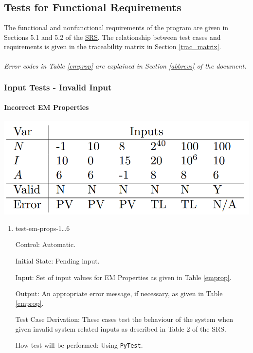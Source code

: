 \documentclass[12pt, titlepage]{article}
\begin{document}
\subsection{Tests for Functional Requirements}
The functional and nonfunctional requirements of the program are given in Sections 5.1 and 5.2 of the \href{https://github.com/husseinsd1/optimal-em-arrangement/blob/main/docs/SRS/SRS.pdf}{SRS}. The relationship between test cases and requirements is given in the traceability matrix in Section \ref{trac_matrix}. \\ \\
\noindent \emph{Error codes in Table \ref{emprop} are explained in Section \ref{abbrevs} of the document.}


\subsubsection{Input Tests - Invalid Input}

		
\paragraph{Incorrect EM Properties}
\begin{center}
  \includegraphics[scale=0.4]{EMInputTable.PNG} \\
  \label{emprop}
\end{center}

\begin{enumerate}

\item{test-em-props-1\dots6\\}

Control: Automatic.
					
Initial State: Pending input.
					
Input: Set of input values for EM Properties as given in Table \ref{emprop}.
					
Output: An appropriate error message, if necessary, as given in Table \ref{emprop}.

Test Case Derivation: These cases test the behaviour of the system when given invalid system related inputs as described in Table 2 of the SRS.
					
How test will be performed: Using \texttt{PyTest}. 
\end{enumerate}
\end{document}
